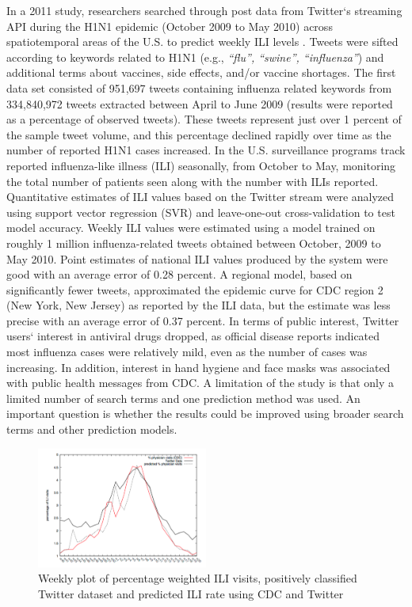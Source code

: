 \documentclass[sigconf]{acmart}
\begin{document}
In a 2011 study, researchers searched through post data from Twitter`s streaming API 
during the H1N1 epidemic (October 2009 to May 2010) across spatiotemporal areas of the 
U.S. to predict weekly ILI levels \cite{signorini11}. Tweets were sifted according to 
keywords related to H1N1 (e.g., {\it ``flu'', ``swine'', ``influenza''}) and additional 
terms about vaccines, side effects, and/or vaccine shortages. The first data set consisted 
of 951,697 tweets containing influenza related keywords from 334,840,972 tweets extracted 
between April to June 2009 (results were reported as a percentage of observed tweets). 
These tweets represent just over 1 percent of the sample tweet volume, and this percentage 
declined rapidly over time as the number of reported H1N1 cases increased. In the U.S. 
surveillance programs track reported influenza-like illness (ILI) seasonally, from October 
to May, monitoring the total number of patients seen along with the number with ILIs 
reported. Quantitative estimates of ILI values based on the Twitter stream were analyzed 
using support vector regression (SVR) and leave-one-out cross-validation to test model 
accuracy. Weekly ILI values were estimated using a model trained on roughly 1 million
influenza-related tweets obtained between October, 2009 to May 2010. Point estimates of 
national ILI values produced by the system were good with an average error of 0.28 percent. 
A regional model, based on significantly fewer tweets, approximated the epidemic curve for 
CDC region 2 (New York, New Jersey) as reported by the ILI data, but the estimate was less 
precise with an average error of 0.37 percent. In terms of public interest, Twitter users` 
interest in antiviral drugs dropped, as official disease reports indicated most 
influenza cases were relatively mild, even as the number of cases was increasing. In 
addition, interest in hand hygiene and face masks was associated with public health 
messages from CDC. A limitation of the study is that only a limited number of search 
terms and one prediction method was used. An important question is whether the results 
could be improved using broader search terms and other prediction models. 

\begin{figure}
  \centering
  \includegraphics[width=0.5\textwidth]{images/Figure2.pdf}
  \caption{Weekly plot of percentage weighted ILI visits, positively classified Twitter
  dataset and predicted ILI rate using CDC and Twitter \cite{achrekar12}} 
  \label{fig:Figure2} 
\end{figure}
\end{document}

